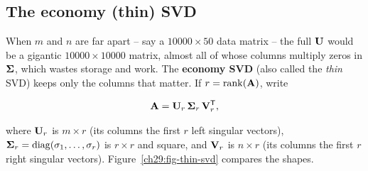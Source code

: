 \subsection{The economy (thin) SVD}

When $m$ and $n$ are far apart -- say a $10000 \times 50$ data matrix -- the
full $\mathbf{U}$ would be a gigantic $10000 \times 10000$ matrix, almost all of
whose columns multiply zeros in $\mathbf{\Sigma}$, which wastes storage and work.
The \textbf{economy SVD} (also called the \emph{thin} SVD) keeps only the
columns that matter. If $r = \operatorname{rank}(\mathbf{A})$, write

\[
  \mathbf{A} = \mathbf{U}_r\,\mathbf{\Sigma}_r\,\mathbf{V}_r^{\mathsf{T}},
\]

where $\mathbf{U}_r$ is $m \times r$ (its columns the first $r$ left singular
vectors), $\mathbf{\Sigma}_r = \operatorname{diag}(\sigma_1,\dots,\sigma_r)$ is $r \times r$ and
square, and $\mathbf{V}_r$ is $n \times r$ (its columns the first $r$
right singular vectors). Figure~\ref{ch29:fig-thin-svd} compares the shapes.

